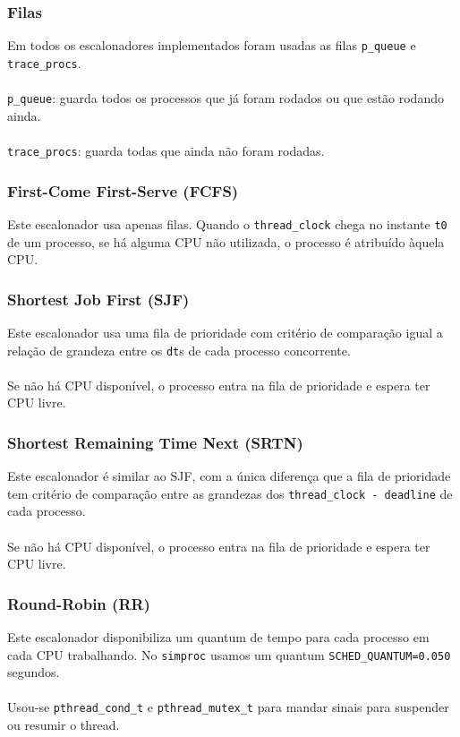 \documentclass{beamer}
\begin{document}

\begin{frame}
  \frametitle{Filas}
  Em todos os escalonadores implementados foram usadas as filas \texttt{p\_queue} e \texttt{trace\_procs}. \\~\\
  
  \texttt{p\_queue}: guarda todos os processos que já foram rodados ou que estão rodando ainda. \\~\\

  \texttt{trace\_procs}: guarda todas que ainda não foram rodadas.
\end{frame}


\begin{frame}
  \frametitle{First-Come First-Serve (FCFS)}
  Este escalonador usa apenas filas. Quando o \texttt{thread\_clock} chega no instante \texttt{t0} de um processo, se há alguma CPU não utilizada, o processo é atribuído àquela CPU.
\end{frame}


\begin{frame}
  \frametitle{Shortest Job First (SJF)}
  Este escalonador usa uma fila de prioridade com critério de comparação igual a relação de grandeza entre os \texttt{dt}s de cada processo concorrente. \\~\\

  Se não há CPU disponível, o processo entra na fila de prioridade e espera ter CPU livre.
\end{frame}


\begin{frame}
  \frametitle{Shortest Remaining Time Next (SRTN)}
  Este escalonador é similar ao SJF, com a única diferença que a fila de prioridade tem critério de comparação entre as grandezas dos \texttt{thread\_clock - deadline} de cada processo. \\~\\

  Se não há CPU disponível, o processo entra na fila de prioridade e espera ter CPU livre.
\end{frame}

\begin{frame}
  \frametitle{Round-Robin (RR)}
  Este escalonador disponibiliza um quantum de tempo para cada processo em cada CPU trabalhando. No \texttt{simproc} usamos um quantum \texttt{SCHED\_QUANTUM=0.050} segundos. \\~\\

  Usou-se \texttt{pthread\_cond\_t} e \texttt{pthread\_mutex\_t} para mandar sinais para suspender ou resumir o thread.
\end{frame}
\end{document}
